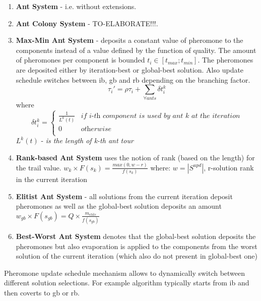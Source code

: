 \begin{enumerate}
\item {\textbf{Ant System} - i.e. without extensions.}

\item {\textbf{Ant Colony System} - TO-ELABORATE!!!.}

\item \textbf{Max-Min Ant System} - deposits a constant value of pheromone to the components instead of a value defined by the function of quality. The amount of pheromones per component is bounded $t_i \in [t_{max};t_{min}]$. The pheromones are deposited either by iteration-best or global-best solution. Also update schedule switches between ib, gb and rb depending on the branching factor.
\begin{equation}
\tau_i' = \rho \tau_i + \sum \limits_{\forall ants} \delta t_i^k
\end{equation}
where
\[
\delta t_i^k =
\left\{
\begin{array}{ll}
      \frac{1}{L^k(t)} & \textit{if i-th component is used by ant k at the iteration}\\
      0 & \textit{otherwise} \\
\end{array} 
\right. 
\]
$L^k(t)$ - \textit{is the length of k-th ant tour}

\item {\textbf{Rank-based Ant System} uses the notion of rank (based on the length) for the trail value.
$w_k \times F(s_k) = \frac{max(0,w-r)}{f(s_k)}$
where: $w=|S^{upd}|$, r-solution rank in the current iteration
}

\item {\textbf{Elitist Ant System} - all solutions from the current iteration deposit pheromones as well as the global-best solution deposits an amount $w_{gb} \times F(s_{gb}) = Q \times \frac{m_{elite}}{f(s_{gb})}$ }

\item {\textbf{Best-Worst Ant System} denotes that the global-best solution deposits the pheromones but also evaporation is applied to the components from the worst solution of the current iteration (which also do not present in global-best one)}

\end{enumerate}

Pheromone update schedule mechanism allows to dynamically switch between different solution selections. For example algorithm typically starts from ib and then coverts to gb or rb.



